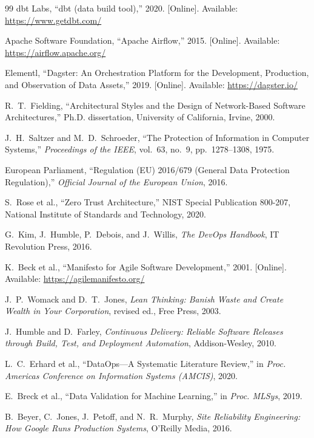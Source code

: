 \documentclass{article}
\begin{document}
\begin{thebibliography}{99}
dbt Labs, ``dbt (data build tool),'' 2020. [Online]. Available: \url{https://www.getdbt.com/}

Apache Software Foundation, ``Apache Airflow,'' 2015. [Online]. Available: \url{https://airflow.apache.org/}

Elementl, ``Dagster: An Orchestration Platform for the Development, Production, and Observation of Data Assets,'' 2019. [Online]. Available: \url{https://dagster.io/}

R.~T.~Fielding, ``Architectural Styles and the Design of Network-Based Software Architectures,'' Ph.D. dissertation, University of California, Irvine, 2000.

J.~H.~Saltzer and M.~D.~Schroeder, ``The Protection of Information in Computer Systems,'' \textit{Proceedings of the IEEE}, vol.~63, no.~9, pp.~1278--1308, 1975.

European Parliament, ``Regulation (EU) 2016/679 (General Data Protection Regulation),'' \textit{Official Journal of the European Union}, 2016.

S.~Rose et al., ``Zero Trust Architecture,'' NIST Special Publication 800-207, National Institute of Standards and Technology, 2020.

G.~Kim, J.~Humble, P.~Debois, and J.~Willis, \textit{The DevOps Handbook}, IT Revolution Press, 2016.

K.~Beck et al., ``Manifesto for Agile Software Development,'' 2001. [Online]. Available: \url{https://agilemanifesto.org/}

J.~P.~Womack and D.~T.~Jones, \textit{Lean Thinking: Banish Waste and Create Wealth in Your Corporation}, revised ed., Free Press, 2003.

J.~Humble and D.~Farley, \textit{Continuous Delivery: Reliable Software Releases through Build, Test, and Deployment Automation}, Addison-Wesley, 2010.

L.~C.~Erhard et al., ``DataOps---A Systematic Literature Review,'' in \textit{Proc. Americas Conference on Information Systems (AMCIS)}, 2020.

E.~Breck et al., ``Data Validation for Machine Learning,'' in \textit{Proc. MLSys}, 2019.

B.~Beyer, C.~Jones, J.~Petoff, and N.~R.~Murphy, \textit{Site Reliability Engineering: How Google Runs Production Systems}, O'Reilly Media, 2016.


\end{thebibliography}
\end{document}
